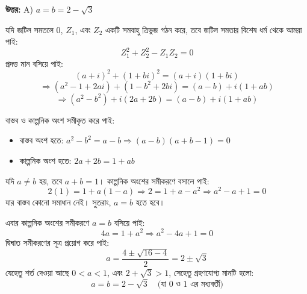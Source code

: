 \documentclass[12pt, a4paper]{article}
\begin{document}
\vspace{0.5em}
\begin{tcolorbox}[answerbox]
    \textbf{\color{success} উত্তর:} A) $a = b = 2 - \sqrt{3}$
\end{tcolorbox}
\vspace{1em}

\begin{tcolorbox}[solutionbox={সমাধান (Solution)}]
    \noindent
    যদি জটিল সমতলে $0$, $Z_1$, এবং $Z_2$ একটি সমবাহু ত্রিভুজ গঠন করে, তবে জটিল সমতার বিশেষ ধর্ম থেকে আমরা পাই:
    \[ Z_1^2 + Z_2^2 - Z_1 Z_2 = 0 \]
    প্রদত্ত মান বসিয়ে পাই:
    \[ (a+i)^2 + (1+bi)^2 = (a+i)(1+bi) \]
    \[ \Rightarrow (a^2 - 1 + 2ai) + (1 - b^2 + 2bi) = (a - b) + i(1 + ab) \]
    \[ \Rightarrow (a^2 - b^2) + i(2a + 2b) = (a - b) + i(1 + ab) \]
    
    \vspace{0.5em}
    বাস্তব ও কাল্পনিক অংশ সমীকৃত করে পাই:
    \begin{itemize}[itemsep=0.3em]
        \item বাস্তব অংশ হতে: $a^2 - b^2 = a - b \Rightarrow (a-b)(a+b-1) = 0$
        \item কাল্পনিক অংশ হতে: $2a + 2b = 1 + ab$
    \end{itemize}
    
    \vspace{0.5em}
    যদি $a \neq b$ হয়, তবে $a+b = 1$। কাল্পনিক অংশের সমীকরণে বসালে পাই:
    \[ 2(1) = 1 + a(1-a) \Rightarrow 2 = 1 + a - a^2 \Rightarrow a^2 - a + 1 = 0 \]
    যার বাস্তব কোনো সমাধান নেই। সুতরাং, $a = b$ হতে হবে।
    
    \vspace{0.5em}
    এবার কাল্পনিক অংশের সমীকরণে $a = b$ বসিয়ে পাই:
    \[ 4a = 1 + a^2 \Rightarrow a^2 - 4a + 1 = 0 \]
    দ্বিঘাত সমীকরণের সূত্র প্রয়োগ করে পাই:
    \[ a = \frac{4 \pm \sqrt{16-4}}{2} = 2 \pm \sqrt{3} \]
    যেহেতু শর্ত দেওয়া আছে $0 < a < 1$, এবং $2 + \sqrt{3} > 1$, সেহেতু গ্রহণযোগ্য মানটি হলো:
    \[ a = b = 2 - \sqrt{3} \quad \text{(যা $0$ ও $1$ এর মধ্যবর্তী)} \]
\end{tcolorbox}

\vspace{1.5em}
\end{document}
